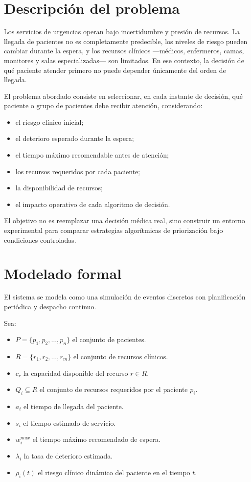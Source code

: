 \documentclass[12pt,a4paper]{article}
\begin{document}
\section{Descripción del problema}

Los servicios de urgencias operan bajo incertidumbre y presión de recursos. La llegada de pacientes no es completamente predecible, los niveles de riesgo pueden cambiar durante la espera, y los recursos clínicos ---médicos, enfermeros, camas, monitores y salas especializadas--- son limitados. En ese contexto, la decisión de qué paciente atender primero no puede depender únicamente del orden de llegada.

El problema abordado consiste en seleccionar, en cada instante de decisión, qué paciente o grupo de pacientes debe recibir atención, considerando:

\begin{itemize}
    \item el riesgo clínico inicial;
    \item el deterioro esperado durante la espera;
    \item el tiempo máximo recomendable antes de atención;
    \item los recursos requeridos por cada paciente;
    \item la disponibilidad de recursos;
    \item el impacto operativo de cada algoritmo de decisión.
\end{itemize}

El objetivo no es reemplazar una decisión médica real, sino construir un entorno experimental para comparar estrategias algorítmicas de priorización bajo condiciones controladas.

\section{Modelado formal}

El sistema se modela como una simulación de eventos discretos con planificación periódica y despacho continuo.

Sea:

\begin{itemize}
    \item $P = \{p_1, p_2, \dots, p_n\}$ el conjunto de pacientes.
    \item $R = \{r_1, r_2, \dots, r_m\}$ el conjunto de recursos clínicos.
    \item $c_r$ la capacidad disponible del recurso $r \in R$.
    \item $Q_i \subseteq R$ el conjunto de recursos requeridos por el paciente $p_i$.
    \item $a_i$ el tiempo de llegada del paciente.
    \item $s_i$ el tiempo estimado de servicio.
    \item $w_i^{max}$ el tiempo máximo recomendado de espera.
    \item $\lambda_i$ la tasa de deterioro estimada.
    \item $\rho_i(t)$ el riesgo clínico dinámico del paciente en el tiempo $t$.
\end{itemize}
\end{document}
